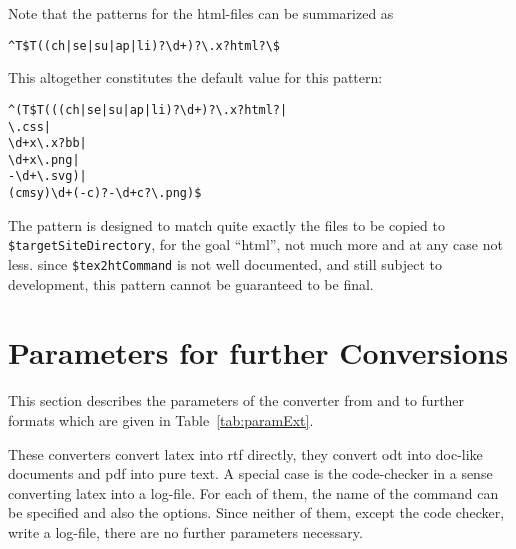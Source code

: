 Note that the patterns for the html-files can be summarized as 
%
\begin{Verbatim}
^T$T((ch|se|su|ap|li)?\d+)?\.x?html?\$
\end{Verbatim}

This altogether constitutes the default value for this pattern: 
%
\begin{verbatim}
^(T$T(((ch|se|su|ap|li)?\d+)?\.x?html?|
\.css|
\d+x\.x?bb|
\d+x\.png|
-\d+\.svg)|
(cmsy)\d+(-c)?-\d+c?\.png)$
\end{verbatim}

The pattern is designed to match quite exactly 
the files to be copied to \texttt{\$targetSiteDirectory}, 
for the goal ``html'', 
not much more and at any case not less. 
since \texttt{\$tex2htCommand} is not well documented, 
and still subject to development, 
this pattern cannot be guaranteed to be final. 


\section{Parameters for further Conversions }
\label{sec:settingsExt}

This section describes the parameters 
of the converter from and to further formats 
which are given in Table~\ref{tab:paramExt}. 

These converters convert latex into rtf directly, 
they convert odt into doc-like documents and pdf into pure text. 
A special case is the code-checker 
in a sense converting latex into a log-file. 
For each of them, the name of the command can be specified 
and also the options. 
Since neither of them, except the code checker, write a log-file, 
there are no further parameters necessary. 


